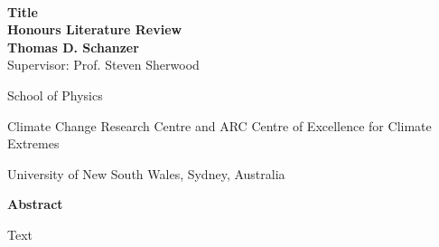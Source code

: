 \documentclass[titlepage]{article}
\begin{document}
\begin{titlepage}
\vfill~

\begin{center}
    {\Huge \textbf{%
        Title
    }} \\
    \vspace{0.75cm}
    {\Large\textbf{Honours Literature Review}} \\
    \vspace{0.75cm}
    {\Large\textbf{Thomas D. Schanzer}} \\
    \vspace{6pt}
    {\large Supervisor: Prof. Steven Sherwood} \\
    \vspace{0.75cm}
    {\large%
        School of Physics

        Climate Change Research Centre and
        ARC Centre of Excellence for Climate Extremes

        University of New South Wales, Sydney, Australia
    }
\end{center}
\vfill
\begin{center}
{\large\textbf{Abstract}}

\begin{minipage}{13cm}
    Text
\end{minipage}
\end{center}
\vfill
\end{titlepage}

\newpage
\tableofcontents

\newpage
\pagestyle{fancy}
\thispagestyle{fancy}

\end{document}
